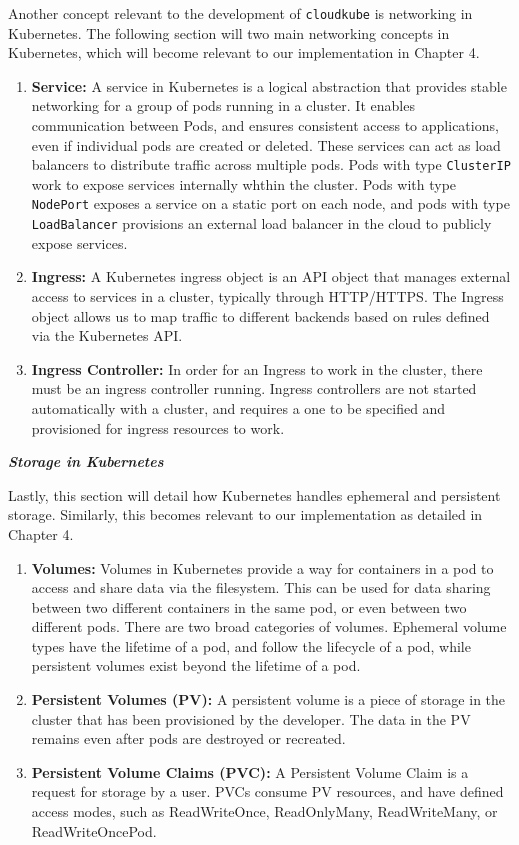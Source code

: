Another concept relevant to the development of \texttt{cloudkube} is networking in Kubernetes. The following section will two main networking concepts in Kubernetes, which will become relevant to our implementation in Chapter 4.
\begin{enumerate}
\item \textbf{Service: }A service in Kubernetes is a logical abstraction that provides stable networking for a group of pods running in a cluster. It enables communication between Pods, and ensures consistent access to applications, even if individual pods are created or deleted. These services can act as load balancers to distribute traffic across multiple pods. Pods with type \texttt{ClusterIP} work to expose services internally whthin the cluster. Pods with type \texttt{NodePort} exposes a service on a static port on each node, and pods with type \texttt{LoadBalancer} provisions an external load balancer in the cloud to publicly expose services. 
\item \textbf{Ingress: }A Kubernetes ingress object is an API object that manages external access to services in a cluster, typically through HTTP/HTTPS. The Ingress object allows us to map traffic to different backends based on rules defined via the Kubernetes API. 
\item \textbf{Ingress Controller: }In order for an Ingress to work in the cluster, there must be an ingress controller running. Ingress controllers are not started automatically with a cluster, and requires a one to be specified and provisioned for ingress resources to work. 
\end{enumerate}

\textbf{\textit{Storage in Kubernetes}}

Lastly, this section will detail how Kubernetes handles ephemeral and persistent storage. Similarly, this becomes relevant to our implementation as detailed in Chapter 4.
\begin{enumerate}
    \item \textbf{Volumes: } Volumes in Kubernetes provide a way for containers in a pod to access and share data via the filesystem. This can be used for data sharing between two different containers in the same pod, or even between two different pods. There are two broad categories of volumes. Ephemeral volume types have the lifetime of a pod, and follow the lifecycle of a pod, while persistent volumes exist beyond the lifetime of a pod.  
    \item \textbf{Persistent Volumes (PV): } A persistent volume is a piece of storage in the cluster that has been provisioned by the developer. The data in the PV remains even after pods are destroyed or recreated. 
    \item \textbf{Persistent Volume Claims (PVC): } A Persistent Volume Claim is a request for storage by a user. PVCs consume PV resources, and have defined access modes, such as ReadWriteOnce, ReadOnlyMany, ReadWriteMany, or ReadWriteOncePod. 
\end{enumerate}

